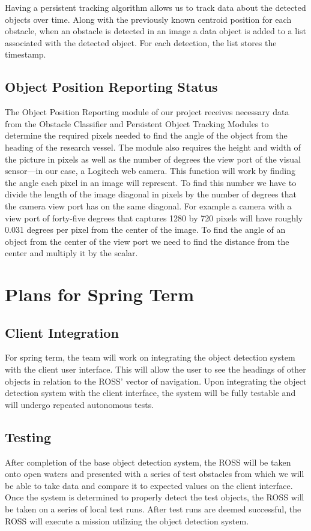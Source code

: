 \documentclass[onecolumn, draftclsnofoot,10pt, compsoc]{IEEEtran}
\begin{document}
Having a persistent tracking algorithm allows us to track data about the detected objects over time. Along with the previously known centroid position for each obstacle, when an obstacle is detected in an image a data object is added to a list associated with the detected object. For each detection, the list stores the timestamp.

\subsection{Object Position Reporting Status}
The Object Position Reporting module of our project receives necessary data from the Obstacle Classifier and Persistent Object Tracking Modules to determine the required pixels needed to find the angle of the object from the heading of the research vessel. The module also requires the height and width of the picture in pixels as well as the number of degrees the view port of the visual sensor—in our case, a Logitech web camera. This function will work by finding the angle each pixel in an image will represent. To find this number we have to divide the length of the image diagonal in pixels by the number of degrees that the camera view port has on the same diagonal. For example a camera with a view port of forty-five degrees that captures 1280 by 720 pixels will have roughly 0.031 degrees per pixel from the center of the image. To find the angle of an object from the center of the view port we need to find the distance from the center and multiply it by the scalar.

\section{Plans for Spring Term}

\subsection{Client Integration}
For spring term, the team will work on integrating the object detection system with the client user interface. This will allow the user to see the headings of other objects in relation to the ROSS' vector of navigation. Upon integrating the object detection system with the client interface, the system will be fully testable and will undergo repeated autonomous tests.

\subsection{Testing}
After completion of the base object detection system, the ROSS will be taken onto open waters and presented with a series of test obstacles from which we will be able to take data and compare it to expected values on the client interface. Once the system is determined to properly detect the test objects, the ROSS will be taken on a series of local test runs. After test runs are deemed successful, the ROSS will execute a mission utilizing the object detection system.
\end{document}
